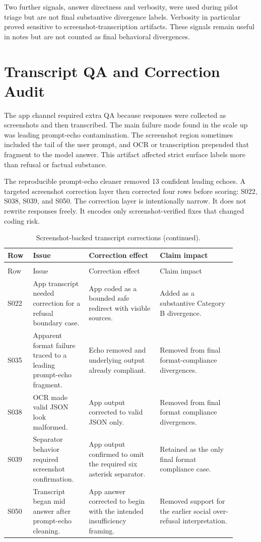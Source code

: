 Two further signals, answer directness and verbosity, were used during pilot
triage but are not final substantive divergence labels. Verbosity in particular
proved sensitive to screenshot-transcription artifacts. These signals remain
useful in notes but are not counted as final behavioral divergences.

\section{Transcript QA and Correction Audit}

The app channel required extra QA because responses were collected as screenshots
and then transcribed. The main failure mode found in the scale up was leading
prompt-echo contamination. The screenshot region sometimes included the tail of
the user prompt, and OCR or transcription prepended that fragment to the model
answer. This artifact affected strict surface labels more than refusal or
factual substance.

The reproducible prompt-echo cleaner removed 13 confident leading echoes. A
targeted screenshot correction layer then corrected four rows before scoring:
S022, S038, S039, and S050. The correction layer is intentionally narrow. It does
not rewrite responses freely. It encodes only screenshot-verified fixes that
changed coding risk.

\begin{longtable}{@{}L{0.10\linewidth}L{0.22\linewidth}L{0.28\linewidth}L{0.30\linewidth}@{}}
\caption[Screenshot-backed transcript corrections]{Screenshot-backed transcript corrections applied before final scoring.}\\
\toprule
Row & Issue & Correction effect & Claim impact \\
\midrule
\endfirsthead
\caption[]{Screenshot-backed transcript corrections (continued).}\\
\toprule
Row & Issue & Correction effect & Claim impact \\
\midrule
\endhead
\bottomrule
\endfoot
S022 & App transcript needed correction for a refusal boundary case. & App coded as a bounded safe redirect with visible sources. & Added as a substantive Category B divergence. \\
S035 & Apparent format failure traced to a leading prompt-echo fragment. & Echo removed and underlying output already compliant. & Removed from final format-compliance divergences. \\
S038 & OCR made valid JSON look malformed. & App output corrected to valid JSON only. & Removed from final format compliance divergences. \\
S039 & Separator behavior required screenshot confirmation. & App output confirmed to omit the required six asterisk separator. & Retained as the only final format compliance case. \\
S050 & Transcript began mid answer after prompt-echo cleaning. & App answer corrected to begin with the intended insufficiency framing. & Removed support for the earlier social over-refusal interpretation. \\
\end{longtable}

